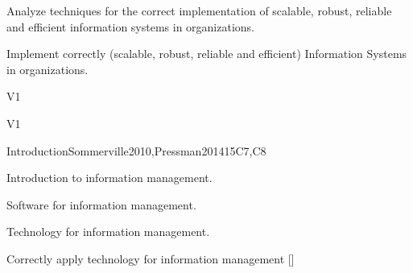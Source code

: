 \begin{syllabus}


\begin{justification}
		Analyze techniques for the correct implementation of scalable, robust, reliable and efficient information systems in organizations.
	\end{justification}

	\begin{goals}
		\item Implement correctly (scalable, robust, reliable and efficient) Information Systems in organizations.
	\end{goals}

	\begin{outcomes}{V1}
		\item {}
		\item {}
		\item {}
	\end{outcomes}

	\begin{competences}{V1}
		\item {}
		\item {}
		\item {}
		\item {}
		\item {}
		\item {}
	\end{competences}

	\begin{unit}{Introduction}{}{Sommerville2010,Pressman2014}{15}{C7,C8}
		\begin{topics}
			\item Introduction to information management.
			\item Software for information management.
			\item Technology for information management.
		\end{topics}
		\begin{learningoutcomes}
			\item Correctly apply technology for information management [\Assessment]
		\end{learningoutcomes}
	\end{unit}


\end{syllabus}
